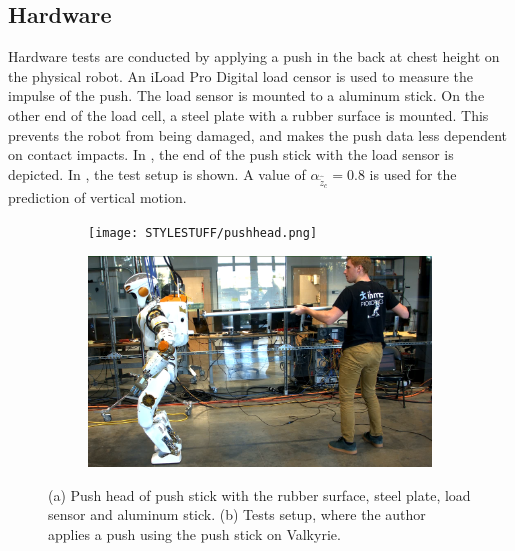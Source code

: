 \subsection{Hardware} 
Hardware tests are conducted by applying a push in the back at chest height on the physical robot. An iLoad Pro Digital load censor is used to measure the impulse of the push. The load sensor is mounted to a aluminum stick. On the other end of the load cell, a steel plate with a rubber surface is mounted. This prevents the robot from being damaged, and makes the push data less dependent on contact impacts. In , the end of the push stick with the load sensor is depicted. In , the test setup is shown. A value of $\alpha_{\hat{\ddot{z}}_{c}}=0.8$ is used for the prediction of vertical motion. 
\begin{figure}
\centering
  \begin{subfigure}{0.495\textwidth}
  \centering
  \texttt{[image: STYLESTUFF/pushhead.png]}
   \caption{}
    \label{fig:pushhead}
  \end{subfigure}
  \begin{subfigure}{0.495\textwidth}
    \centering
  \includegraphics[width=.94\linewidth]{STYLESTUFF/authorpush.png}
  \caption{}
   \label{fig:authorpush}
  \end{subfigure}
  \caption{(a) Push head of push stick with the rubber surface, steel plate, load sensor and aluminum stick. (b) Tests setup, where the author applies a push using the push stick on Valkyrie.}
  \label{fig:pushsetup}
\end{figure}

